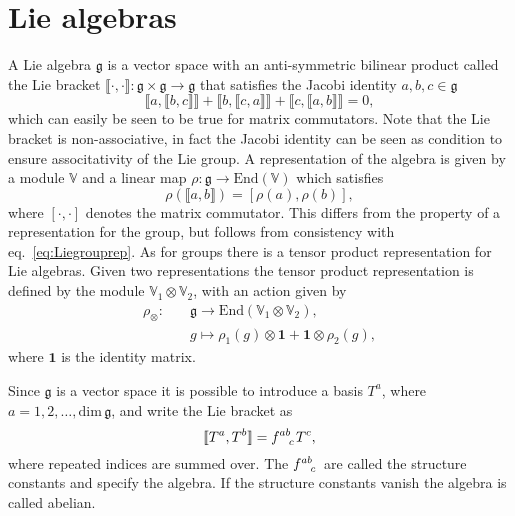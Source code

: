 \section{Lie algebras}\label{sec:Liealgebras}
A Lie algebra $\mathfrak{g}$ is a vector space with an anti-symmetric bilinear product called the Lie bracket $\llbracket\cdot,\cdot\rrbracket: \mathfrak{g}\times\mathfrak{g}\to\mathfrak{g}$ that satisfies the Jacobi identity $a,b,c\in\mathfrak{g}$
\begin{equation}
\llbracket a,\llbracket b,c\rrbracket\rrbracket+\llbracket b,\llbracket c,a\rrbracket\rrbracket+\llbracket c,\llbracket a,b\rrbracket\rrbracket=0, 
\end{equation}
which can easily be seen to be true for matrix commutators. Note that the Lie bracket is non-associative, in fact the Jacobi identity can be seen as condition to ensure associtativity of the Lie group. A representation of the algebra is given by a module $\mathbb{V}$ and a linear map $\rho: \mathfrak{g}\to \text{End}(\mathbb{V})$ which satisfies
\begin{equation}\label{eq:lierep}
    \rho(\llbracket a,b\rrbracket) = [\rho(a),\rho(b)],
\end{equation}
where $[\cdot,\cdot]$ denotes the matrix commutator. This differs from the property of a representation for the group, but follows from consistency with eq.\ \eqref{eq:Liegrouprep}. As for groups there is a tensor product representation for Lie algebras. Given two representations the tensor product representation is defined by the module $\mathbb{V}_1\otimes\mathbb{V}_2$, with an action given by 
\begin{equation}
    \begin{aligned}
        \rho_\otimes:\quad &\mathfrak{g}\to\text{End}\left(\mathbb{V}_1\otimes\mathbb{V}_2\right), \\
                & g\mapsto \rho_1(g)\otimes \mathbf{1}+\mathbf{1}\otimes\rho_2(g),
    \end{aligned}
\end{equation}
where $\mathbf{1}$ is the identity matrix.


Since $\mathfrak{g}$ is a vector space it is possible to introduce a basis $T^a$, where $a=1,2,\ldots,\text{dim}\,\mathfrak{g}$, and write the Lie bracket as 
\begin{equation}
    \llbracket T^a,T^b\rrbracket = \tensor{f}{^{ab}_c} T^c,
\end{equation}
where repeated indices are summed over. The $\tensor{f}{^{ab}_c}$ are called the structure constants and specify the algebra. If the structure constants vanish the algebra is called abelian.

